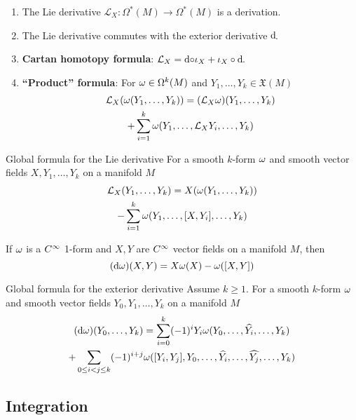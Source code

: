 \begin{theorem}{}{}
    \begin{enumerate}
        \item The Lie derivative \(\mathcal{L}_X \colon \Omega^*(M) \rightarrow \Omega^*(M)\) is a derivation.
        \item The Lie derivative commutes with the exterior derivative \(\dif\).
        \item \textbf{Cartan homotopy formula}: \(\mathcal{L}_X = \dif \circ \iota_X + \iota_X \circ \dif\).
        \item \textbf{``Product'' formula}: For \(\omega \in \Omega^k(M)\) and \(Y_1, \dots, Y_k \in \mathfrak{X}(M)\) 
        \begin{multline}
            \mathcal{L}_X(\omega (Y_1, \dots, Y_k)) = (\mathcal{L}_X \omega)(Y_1, \dots, Y_k) \\ 
            + \sum_{i=1}^k \omega(Y_1, \dots, \mathcal{L}_X Y_i, \dots, Y_k)  
        \end{multline}
    \end{enumerate}
\end{theorem}
\begin{theorem}{Global formula for the Lie derivative}{}
    For a smooth \(k\)-form \(\omega\) and smooth vector fields \(X,Y_1, \dots, Y_k\) on a manifold \(M\)
    \begin{multline}
        \mathcal{L}_X(Y_1, \dots, Y_k) = X(\omega(Y_1, \dots, Y_k)) \\ 
        -  \sum_{i=1}^k \omega(Y_1, \dots, [X,Y_i], \dots, Y_k)  
    \end{multline}
\end{theorem}
\begin{proposition}{}{}
    If \(\omega\) is a \(C^\infty\) 1-form and \(X,Y\) are \(C^\infty\) vector fields on a manifold \(M\), then 
    \[
        (\dif \w)(X,Y) = X \w(X) - \w ([X,Y])
    \]
\end{proposition}
\begin{theorem}{Global formula for the exterior derivative}{}
    Assume \(k \geq 1\). 
    For a smooth \(k\)-form \(\omega\) and smooth vector fields \(Y_0, Y_1, \dots, Y_k\) on a manifold \(M\)
    \begin{multline*}
        (\dif \w)(Y_0, \dots, Y_k) = \sum_{i=0}^k (-1)^i Y_i \w(Y_0, \dots, \widehat{Y_i}, \dots, Y_k) \\ 
        + \sum_{0 \leq i < j \leq k} (-1)^{i+j} \w([Y_i, Y_j], Y_0, \dots, \widehat{Y_i}, \dots, \widehat{Y_j}, \dots, Y_k)
    \end{multline*}
\end{theorem}

\subsection{Integration}